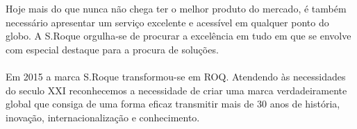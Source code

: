 Hoje mais do que nunca não chega ter o melhor produto do mercado, é também necessário apresentar um serviço excelente e acessível em qualquer ponto do globo. A S.Roque orgulha-se de procurar a excelência em tudo em que se envolve com especial destaque para a procura de soluções.\\
\\
Em 2015 a marca S.Roque transformou-se em ROQ. Atendendo às necessidades do seculo XXI reconhecemos a necessidade de criar uma marca verdadeiramente global que consiga de uma forma eficaz transmitir mais de 30 anos de história, inovação, internacionalização e conhecimento.















